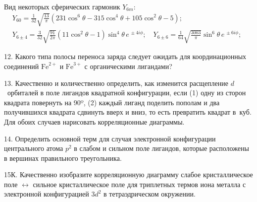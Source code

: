 \\
Вид некоторых сферических гармоник $\textit{Y}_{6m}$:
\begin{equation*}
 \begin{aligned}
&\textit{Y}_{60} =\frac{1}{32}\sqrt{\frac{13}{\pi}}\left(231 \cos^6{\theta}-315\cos^4{\theta}+105\cos^2{\theta}-5 \right); 
\\[6pt]
&\textit{Y}_{6\pm4} =\frac{3}{32}\sqrt{\frac{91}{2\pi}} \left( 11\cos^2{\theta}-1\right) \sin^4 {\theta} \, e^{\,\pm4i\phi}; \quad \textit{Y}_{6\pm6}=\frac{1}{64}\sqrt{\frac{3003}{\pi}} \sin^6 {\theta} \, e^{\,\pm6i\phi};\,\,\quad\quad
 \end{aligned}
\end{equation*}
\par
12. Какого типа полосы переноса заряда следует ожидать для координационных соединений $\text{Fe}^{2+}$ и $\text{Fe}^{3+}$ с органическими лигандами?
\par
13. Качественно и количественно определить, как изменится расщепление $d$~орбиталей в поле лигандов квадратной конфигурации, если (1) одну из сторон квадрата повернуть на 90º, (2) каждый лиганд поделить пополам и два получившихся квадрата сдвинуть вверх и вниз, то есть превратить квадрат в~куб. Для обоих случаев нарисовать корреляционные диаграммы.
\par
14. Определить основной терм для случая электронной конфигурации центрального атома $p^2$ в слабом и сильном поле лигандов, которые расположены в вершинах правильного треугольника.
\par
15К. Качественно изобразите корреляционную диаграмму слабое кристаллическое поле $\leftrightarrow$ сильное кристаллическое поле для триплетных термов иона металла с электронной конфигурацией $3d^2$ в тетраэдрическом окружении.
\par